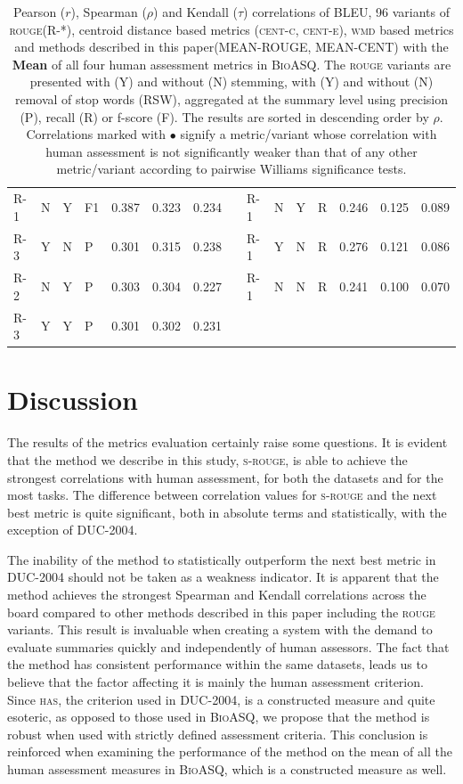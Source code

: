 \documentclass[11pt,a4paper]{article}
\newcommand{\rouge}{\textsc{rouge}\xspace}
\newcommand{\centc}{\textsc{cent-c}\xspace}
\newcommand{\cente}{\textsc{cent-e}\xspace}
\newcommand{\wmd}{\textsc{wmd}\xspace}
\newcommand{\bioasq}{\textsc{BioASQ}\xspace}
\newcommand{\duc}{\textsc{DUC-2004}\xspace}
\newcommand{\srouge}{\textsc{s-rouge}\xspace}
\newcommand{\has}{\textsc{has}\xspace}
\begin{document}
\begin{table}[]
{\begin{tabular}{lllllllllllllll}
\textsc{R-1} & N & Y & F1 & 0.387 & 0.323 & 0.234 &  & \textsc{R-1} & N & Y & R & 0.246 & 0.125 & 0.089 \\
\textsc{R-3} & Y & N & P & 0.301 & 0.315 & 0.238 &  & \textsc{R-1} & Y & N & R & 0.276 & 0.121 & 0.086 \\
\textsc{R-2} & N & Y & P & 0.303 & 0.304 & 0.227 &  & \textsc{R-1} & N & N & R & 0.241 & 0.100 & 0.070 \\
\textsc{R-3} & Y & Y & P & 0.301 & 0.302 & 0.231 &  &  &  &  &  &  &  &  \\ \hline
\end{tabular}
}
\caption{Pearson ($r$), Spearman ($\rho$) and Kendall ($\tau$) correlations of BLEU, 96 variants 
of \rouge (R-*), centroid distance based metrics (\centc, \cente), \wmd based metrics and 
methods described in this paper(\textsc{MEAN-ROUGE}, \textsc{MEAN-CENT}) with the \textbf{Mean} of 
all four human assessment metrics in \bioasq. The \rouge variants are presented with (Y) and 
without (N) stemming, with (Y) and without (N) removal of stop words (RSW), aggregated at the 
summary level using precision (P), recall (R) or f-score (F). The results are sorted in descending 
order by $\rho$. Correlations marked with $\bullet$ signify a metric/variant whose correlation 
with human assessment is not significantly weaker than that of any other metric/variant according 
to pairwise Williams significance tests.}
\label{tab:bioasq-mean-correlations}
\end{table}


\section{Discussion}
\label{ssec:discussion}
The results of the metrics evaluation certainly raise some questions. It is evident that the method 
we describe in this study, \srouge, is able to achieve the strongest correlations with human assessment, 
for both the datasets and for the most tasks. The difference between correlation values 
for \srouge and the next best metric is quite significant, both in absolute terms and statistically, 
with the exception of \duc.

The inability of the method to statistically outperform the next best metric in \duc should not
be taken as a weakness indicator. It is apparent that the method achieves the strongest 
Spearman and Kendall correlations across the board compared to other methods described 
in this paper including the \rouge variants. This result is invaluable when creating a 
system with the demand to evaluate summaries quickly and independently of human assessors. 
The fact that the method has consistent performance within the same datasets, leads us to 
believe that the factor affecting it is mainly the human assessment criterion. Since \has, 
the criterion used in \duc, is a constructed measure and quite esoteric, as opposed to 
those used in \bioasq, we propose that the method is robust when used with strictly 
defined assessment criteria. This conclusion is reinforced when examining the performance 
of the method on the mean of all the human assessment measures in \bioasq, which is a 
constructed measure as well.
\end{document}
